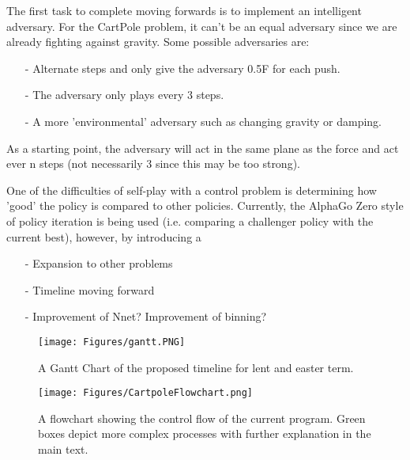 \documentclass[a4paper]{article}
\begin{document}
The first task to complete moving forwards is to implement an intelligent adversary. For the CartPole problem, it can’t be an equal adversary since we are already fighting against gravity. Some possible adversaries are: 
\begin{itemize}
   \item[-] Alternate steps and only give the adversary 0.5F for each push.
   \item[-] The adversary only plays every 3 steps.
   \item[-] A more 'environmental' adversary such as changing gravity or damping.
\end{itemize}
 As a starting point, the adversary will act in the same plane as the force and act ever n steps (not necessarily 3 since this may be too strong). 

 One of the difficulties of self-play with a control problem is determining how 'good' the policy is compared to other policies. Currently, the AlphaGo Zero style of policy iteration is being used (i.e. comparing a challenger policy with the current best), however, by introducing a 

\begin{itemize}
   \item[-] Expansion to other problems
   \item[-] Timeline moving forward
   \item[-] Improvement of Nnet? Improvement of binning?
\end{itemize}

\begin{figure}[h]
   \centering
   \texttt{[image: Figures/gantt.PNG]}
   \caption{\label{fig:gantt} A Gantt Chart of the proposed timeline for lent and easter term.}
\end{figure}





\begin{figure}[b]
   \centering
   \texttt{[image: Figures/CartpoleFlowchart.png]}
   \caption{\label{fig:flowchart} A flowchart showing the control flow of the current program. Green boxes depict more complex processes with further explanation in the main text.}
\end{figure}
\end{document}
